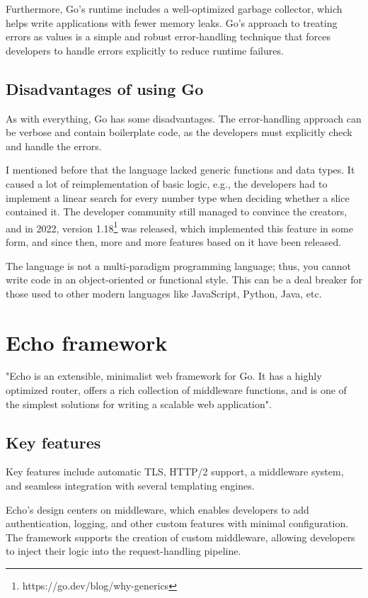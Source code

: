 Furthermore, Go's runtime includes a well-optimized garbage collector, which helps write applications with fewer memory leaks. Go's approach to treating errors as values is a simple and robust error-handling technique that forces developers to handle errors explicitly to reduce runtime failures.

\subsection{Disadvantages of using Go}

As with everything, Go has some disadvantages. The error-handling approach can be verbose and contain boilerplate code, as the developers must explicitly check and handle the errors.

I mentioned before that the language lacked generic functions and data types. It caused a lot of reimplementation of basic logic, e.g., the developers had to implement a linear search for every number type when deciding whether a slice contained it. The developer community still managed to convince the creators, and in 2022, version 1.18\footnote{https://go.dev/blog/why-generics} was released, which implemented this feature in some form, and since then, more and more features based on it have been released.

The language is not a multi-paradigm programming language; thus, you cannot write code in an object-oriented or functional style. This can be a deal breaker for those used to other modern languages like JavaScript, Python, Java, etc.

\section{Echo framework}

"Echo is an extensible, minimalist web framework for Go. It has a highly optimized router, offers a rich collection of middleware functions, and is one of the simplest solutions for writing a scalable web application"\cite{EchoFramework}.

\subsection{Key features}

Key features include automatic TLS, HTTP/2 support, a middleware system, and seamless integration with several templating engines. 

Echo's design centers on middleware, which enables developers to add authentication, logging, and other custom features with minimal configuration. The framework supports the creation of custom middleware, allowing developers to inject their logic into the request-handling pipeline. 

